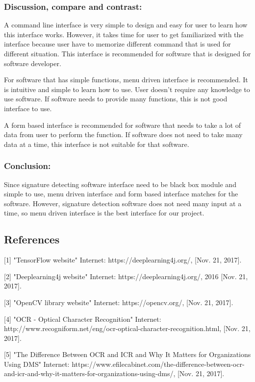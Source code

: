\documentclass[article, onecolumn, draftclsnofoot,10pt, compsoc]{IEEEtran}
\begin{document}
\subsubsection{Discussion, compare and contrast:}
A command line interface is very simple to design and easy for user to learn how this interface works. However, it takes time for user to get familiarized with the interface because user have to memorize different command that is used for different situation. This interface is recommended for software that is designed for software developer. 

For software that has simple functions, menu driven interface is recommended. It is intuitive and simple to learn how to use. User doesn\rq t require any knowledge to use software. If software needs to provide many functions, this is not good interface to use.

A form based interface is recommended for software that needs to take a lot of data from user to perform the function. If software does not need to take many data at a time, this interface is not suitable for that software.


\subsubsection{Conclusion:}
Since signature detecting software interface need to be black box module and simple to use, menu driven interface and form based interface matches for the software. However, signature detection software does not need many input at a time, so menu driven interface is the best interface for our project.

\subsection{References}
[1] "TensorFlow website" Internet: https://deeplearning4j.org/, [Nov. 21, 2017].

[2] "Deeplearning4j website" Internet: https://deeplearning4j.org/, 2016 [Nov. 21, 2017]. 

[3] "OpenCV library website" Internet: https://opencv.org/, [Nov. 21, 2017].

[4] "OCR - Optical Character Recognition" Internet: http://www.recogniform.net/eng/ocr-optical-character-recognition.html, [Nov. 21, 2017].

[5] "The Difference Between OCR and ICR and Why It Matters for Organizations Using DMS" Internet: https://www.efilecabinet.com/the-difference-between-ocr-and-icr-and-why-it-matters-for-organizations-using-dms/, [Nov. 21, 2017].
\end{document}
